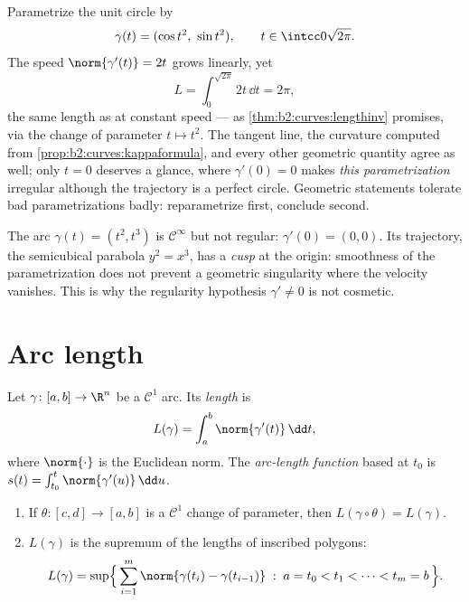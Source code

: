 \begin{example}\label{ex:b2:curves:speedinvariance}
Parametrize the unit circle by
\[
\gamma(t) = (\cos t^2,\ \sin t^2),
\qquad t \in \intcc0{\sqrt{2\pi}} .
\]
The speed $\norm{\gamma'(t)} = 2t$ grows linearly, yet
\[
L = \int_0^{\sqrt{2\pi}}2t\,\dd t = 2\pi ,
\]
the same length as at constant speed --- as
\cref{thm:b2:curves:lengthinv} promises, via the change of
parameter $t \mapsto t^2$. The tangent line, the curvature
computed from \cref{prop:b2:curves:kappaformula}, and every
other geometric quantity agree as well; only $t = 0$
deserves a glance, where $\gamma'(0) = 0$ makes \emph{this
parametrization} irregular although the trajectory is a
perfect circle. Geometric statements tolerate bad
parametrizations badly: reparametrize first, conclude
second.
\end{example}

\begin{example}\label{ex:b2:curves:cusp}
The arc $\gamma(t) = (t^2, t^3)$ is $\mathcal{C}^\infty$ but not
regular: $\gamma'(0) = (0, 0)$. Its trajectory, the semicubical
parabola $y^2 = x^3$, has a \emph{cusp} at the origin: smoothness
of the parametrization does not prevent a geometric singularity
where the velocity vanishes. This is why the regularity hypothesis
$\gamma' \neq 0$ is not cosmetic.
\end{example}

\section{Arc length}

\begin{definition}\label{def:b2:curves:length}
Let $\gamma \colon [a, b] \to \R^n$ be a $\mathcal{C}^1$ arc. Its
\emph{length} is
\[
L(\gamma) = \int_a^b \norm{\gamma'(t)}\, \dd t ,
\]
where $\norm{\cdot}$ is the Euclidean norm. The \emph{arc-length
function} based at $t_0$ is $s(t) = \int_{t_0}^t
\norm{\gamma'(u)}\,\dd u$.
\end{definition}

\begin{theorem}\label{thm:b2:curves:lengthinv}
\leavevmode
\begin{enumerate}
\item If $\theta \colon [c, d] \to [a, b]$ is a $\mathcal{C}^1$
change of parameter, then $L(\gamma \circ \theta) = L(\gamma)$.
\item $L(\gamma)$ is the supremum of the lengths of inscribed
polygons:
\[
L(\gamma)
= \sup\Bigl\{\, \sum_{i=1}^{m} \norm{\gamma(t_i) -
\gamma(t_{i-1})} \;:\; a = t_0 < t_1 < \dots < t_m = b \,\Bigr\}.
\]
\end{enumerate}
\end{theorem}


